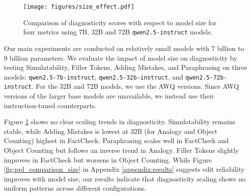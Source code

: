 \begin{figure}
    \centering
    \texttt{[image: figures/size\_effect.pdf]}
    \caption{Comparison of diagnosticity scores with respect to model size for four metrics using 7B, 32B and 72B \texttt{qwen2.5-instruct} models.}
    \label{fig:size_effect}
\end{figure}


Our main experiments are conducted on relatively small models with 7 billion to 9 billion parameters. We evaluate the impact of model size on diagnosticity by testing Simulatability, Filler Tokens, Adding Mistakes, and Paraphrasing on three models: \texttt{qwen2.5-7b-instruct}, \texttt{qwen2.5-32b-instruct}, and \texttt{qwen2.5-72b-instruct}. For the 32B and 72B models, we use the AWQ \citep{lin2023awq} versions. Since AWQ versions of the larger base models are unavailable, we instead use their instruction-tuned counterparts.  

Figure \ref{fig:size_effect} shows no clear scaling trends in diagnosticity. Simulatability remains stable, while Adding Mistakes is lowest at 32B (for Analogy and Object Counting) highest in FactCheck. Paraphrasing scales well in FactCheck and Object Counting but follows an inverse trend in Analogy. Filler Tokens slightly improves in FactCheck but worsens in Object Counting. While Figure \ref{fig:ppl_comparison_size} in Appendix \ref{appendix:results} suggests edit reliability improves with model size, our results indicate that diagnosticity scaling shows no uniform patterns across different configurations.